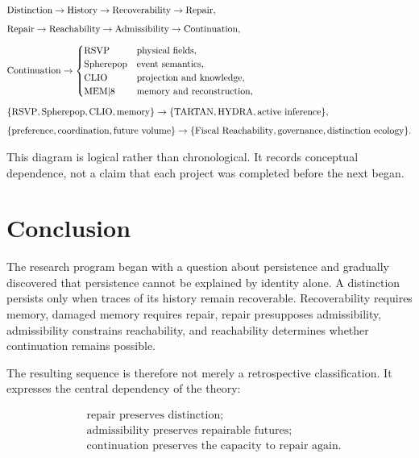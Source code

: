 \documentclass[11pt,oneside]{book}
\numberwithin{equation}{chapter}
\theoremstyle{definition}
\theoremstyle{plain}
\begin{document}
\[
\begin{aligned}
&\text{Distinction}
\rightarrow
\text{History}
\rightarrow
\text{Recoverability}
\rightarrow
\text{Repair},
\\[0.5em]
&\text{Repair}
\rightarrow
\text{Reachability}
\rightarrow
\text{Admissibility}
\rightarrow
\text{Continuation},
\\[0.5em]
&\text{Continuation}
\rightarrow
\begin{cases}
\text{RSVP} & \text{physical fields},\\
\text{Spherepop} & \text{event semantics},\\
\text{CLIO} & \text{projection and knowledge},\\
\text{MEM\textbar 8} & \text{memory and reconstruction},
\end{cases}
\\[0.5em]
&\{\text{RSVP},\text{Spherepop},\text{CLIO},\text{memory}\}
\rightarrow
\{\text{TARTAN},\text{HYDRA},\text{active inference}\},
\\[0.5em]
&\{\text{preference},\text{coordination},\text{future volume}\}
\rightarrow
\{\text{Fiscal Reachability},\text{governance},\text{distinction ecology}\}.
\end{aligned}
\]

This diagram is logical rather than chronological. It records conceptual
dependence, not a claim that each project was completed before the next
began.

\section{Conclusion}

The research program began with a question about persistence and gradually discovered that persistence cannot be explained by identity alone. A distinction persists only when traces of its history remain recoverable. Recoverability requires memory, damaged memory requires repair, repair presupposes admissibility, admissibility constrains reachability, and reachability determines whether continuation remains possible.

The resulting sequence is therefore not merely a retrospective
classification. It expresses the central dependency of the theory:

\[
\boxed{
\begin{aligned}
&\text{repair preserves distinction;}\\
&\text{admissibility preserves repairable futures;}\\
&\text{continuation preserves the capacity to repair again}.
\end{aligned}
}
\]
\end{document}
